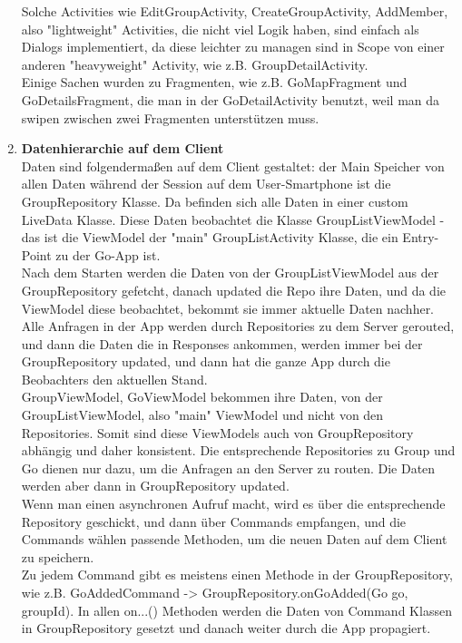 \documentclass[11pt,a4paper]{scrartcl}
\begin{document}
\begin{enumerate}
Solche Activities wie EditGroupActivity, CreateGroupActivity, AddMember, also "lightweight" Activities, die nicht viel Logik haben, sind einfach als Dialogs implementiert, da diese leichter zu managen sind in Scope von einer anderen "heavyweight" Activity, wie z.B. GroupDetailActivity. \\

Einige Sachen wurden zu Fragmenten, wie z.B. GoMapFragment und GoDetailsFragment, die man in der GoDetailActivity benutzt, weil man da swipen zwischen zwei Fragmenten unterstützen muss.

\item \textbf{Datenhierarchie auf dem Client}\\
Daten sind folgendermaßen auf dem Client gestaltet: der Main Speicher von allen Daten während der Session auf dem User-Smartphone ist die GroupRepository Klasse. Da befinden sich alle Daten in einer custom LiveData Klasse. Diese Daten beobachtet die Klasse GroupListViewModel - das ist die ViewModel der "main" GroupListActivity Klasse, die ein Entry-Point zu der Go-App ist. \\

Nach dem Starten werden die Daten von der GroupListViewModel aus der GroupRepository gefetcht, danach updated die Repo ihre Daten, und da die ViewModel diese beobachtet, bekommt sie immer aktuelle Daten nachher. Alle Anfragen in der App werden durch Repositories zu dem Server gerouted, und dann die Daten die in Responses ankommen, werden immer bei der GroupRepository updated, und dann hat die ganze App durch die Beobachters den aktuellen Stand.\\

GroupViewModel, GoViewModel bekommen ihre Daten, von der GroupListViewModel, also "main" ViewModel und nicht von den Repositories. Somit sind diese ViewModels auch von GroupRepository abhängig und daher konsistent. Die entsprechende Repositories zu Group und Go dienen nur dazu, um die Anfragen an den Server zu routen. Die Daten werden aber dann in GroupRepository updated.\\

Wenn man einen asynchronen Aufruf macht, wird es über die entsprechende Repository geschickt, und dann über Commands empfangen, und die Commands wählen passende Methoden, um die neuen Daten auf dem Client zu speichern.\\

Zu jedem Command gibt es meistens einen Methode in der GroupRepository, wie z.B. GoAddedCommand -> GroupRepository.onGoAdded(Go go, groupId). In allen on...() Methoden werden die Daten von Command Klassen in GroupRepository gesetzt und danach weiter durch die App propagiert.


\end{enumerate}
\end{document}
